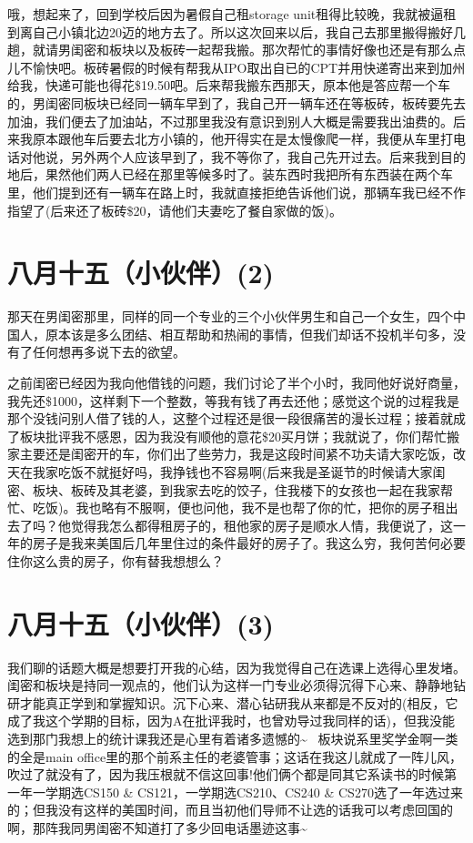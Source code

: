 \documentclass[12pt]{book}
\begin{document}
哦，想起来了，回到学校后因为暑假自己租storage unit租得比较晚，我就被逼租到离自己小镇北边20迈的地方去了。所以这次回来以后，我自己去那里搬得搬好几趟，就请男闺密和板块以及板砖一起帮我搬。那次帮忙的事情好像也还是有那么点儿不愉快吧。板砖暑假的时候有帮我从IPO取出自已的CPT并用快递寄出来到加州给我，快递可能也得花\$19.50吧。后来帮我搬东西那天，原本他是答应帮一个车的，男闺密同板块已经同一辆车早到了，我自己开一辆车还在等板砖，板砖要先去加油，我们便去了加油站，不过那里我没有意识到别人大概是需要我出油费的。后来我原本跟他车后要去北方小镇的，他开得实在是太慢像爬一样，我便从车里打电话对他说，另外两个人应该早到了，我不等你了，我自己先开过去。后来我到目的地后，果然他们两人已经在那里等候多时了。装东西时我把所有东西装在两个车里，他们提到还有一辆车在路上时，我就直接拒绝告诉他们说，那辆车我已经不作指望了(后来还了板砖\$20，请他们夫妻吃了餐自家做的饭)。

\section{八月十五（小伙伴）(2)}
\label{sec-14-2}

那天在男闺密那里，同样的同一个专业的三个小伙伴男生和自己一个女生，四个中国人，原本该是多么团结、相互帮助和热闹的事情，但我们却话不投机半句多，没有了任何想再多说下去的欲望。

之前闺密已经因为我向他借钱的问题，我们讨论了半个小时，我同他好说好商量，我先还\$1000，这样剩下一个整数，等我有钱了再去还他；感觉这个说的过程我是那个没钱问别人借了钱的人，这整个过程还是很一段很痛苦的漫长过程；接着就成了板块批评我不感恩，因为我没有顺他的意花\$20买月饼；我就说了，你们帮忙搬家主要还是闺密开的车，你们出了些劳力，我是这段时间紧不功夫请大家吃饭，改天在我家吃饭不就挺好吗，我挣钱也不容易啊(后来我是圣诞节的时候请大家闺密、板块、板砖及其老婆，到我家去吃的饺子，住我楼下的女孩也一起在我家帮忙、吃饭)。我也略有不服啊，便也问他，我不是也帮了你的忙，把你的房子租出去了吗？他觉得我怎么都得租房子的，租他家的房子是顺水人情，我便说了，这一年的房子是我来美国后几年里住过的条件最好的房子了。我这么穷，我何苦何必要住你这么贵的房子，你有替我想想么？

\section{八月十五（小伙伴）(3)}
\label{sec-14-3}

我们聊的话题大概是想要打开我的心结，因为我觉得自己在选课上选得心里发堵。闺密和板块是持同一观点的，他们认为这样一门专业必须得沉得下心来、静静地钻研才能真正学到和掌握知识。沉下心来、潜心钻研我从来都是不反对的(相反，它成了我这个学期的目标，因为A在批评我时，也曾劝导过我同样的话)，但我没能选到那门我想上的统计课我还是心里有着诸多遗憾的\textasciitilde{}~ 板块说系里奖学金啊一类的全是main office里的那个前系主任的老婆管事；这话在我这儿就成了一阵儿风，吹过了就没有了，因为我压根就不信这回事!他们俩个都是同其它系读书的时候第一年一学期选CS150 \& CS121，一学期选CS210、CS240 \& CS270选了一年选过来的；但我没有这样的美国时间，而且当初他们导师不让选的话我可以考虑回国的啊，那阵我同男闺密不知道打了多少回电话墨迹这事\textasciitilde{}~
\end{document}
